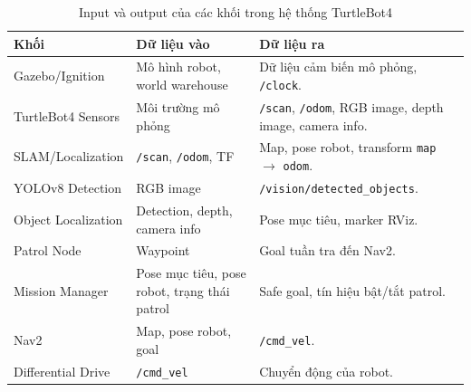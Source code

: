 \begin{table}[H]
    \centering
    \caption{Input và output của các khối trong hệ thống TurtleBot4}
    \label{tab:system-blocks}
    \renewcommand{\arraystretch}{1.25}
    \small
    \begin{tabularx}{\textwidth}{|>{\raggedright\arraybackslash}p{}|>{\raggedright\arraybackslash}p{}|>{\raggedright\arraybackslash}X|}
        \hline
        \textbf{Khối} & \textbf{Dữ liệu vào} & \textbf{Dữ liệu ra} \\
        \hline
        Gazebo/Ignition & Mô hình robot, world warehouse & Dữ liệu cảm biến mô phỏng, \texttt{/clock}. \\
        \hline
        TurtleBot4 Sensors & Môi trường mô phỏng & \texttt{/scan}, \texttt{/odom}, RGB image, depth image, camera info. \\
        \hline
        SLAM/Localization & \texttt{/scan}, \texttt{/odom}, TF & Map, pose robot, transform \texttt{map} $\rightarrow$ \texttt{odom}. \\
        \hline
        YOLOv8 Detection & RGB image & \texttt{/vision/detected\_objects}. \\
        \hline
        Object Localization & Detection, depth, camera info & Pose mục tiêu, marker RViz. \\
        \hline
        Patrol Node & Waypoint & Goal tuần tra đến Nav2. \\
        \hline
        Mission Manager & Pose mục tiêu, pose robot, trạng thái patrol & Safe goal, tín hiệu bật/tắt patrol. \\
        \hline
        Nav2 & Map, pose robot, goal & \texttt{/cmd\_vel}. \\
        \hline
        Differential Drive & \texttt{/cmd\_vel} & Chuyển động của robot. \\
        \hline
    \end{tabularx}
\end{table}

